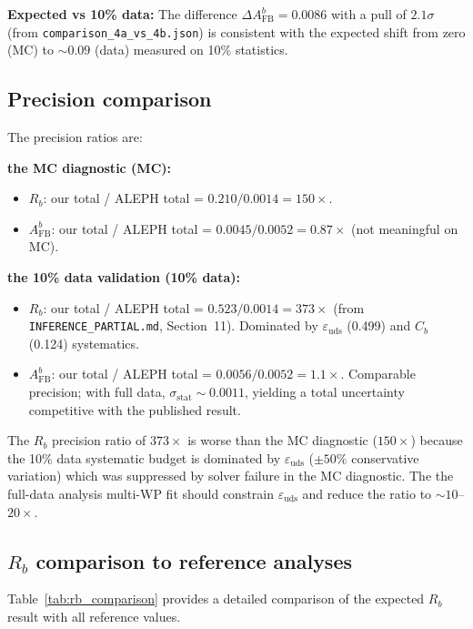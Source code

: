 \documentclass[11pt,a4paper]{article}
\begin{document}
\textbf{Expected vs 10\% data:} The difference $\Delta A_\mathrm{FB}^b = 0.0086$ with
a pull of $2.1\sigma$ (from \texttt{comparison\_4a\_vs\_4b.json}) is consistent with
the expected shift from zero (MC) to $\sim 0.09$ (data) measured on 10\% statistics.

\subsection{Precision comparison}
\label{sec:precision_comparison}

The precision ratios are:

\textbf{the MC diagnostic (MC):}
\begin{itemize}
\item $R_b$: our total / ALEPH total = $0.210/0.0014 = 150\times$.
\item $A_\mathrm{FB}^b$: our total / ALEPH total = $0.0045/0.0052 = 0.87\times$
(not meaningful on MC).
\end{itemize}

\textbf{the 10\% data validation (10\% data):}
\begin{itemize}
\item $R_b$: our total / ALEPH total = $0.523/0.0014 = 373\times$
(from \texttt{INFERENCE\_PARTIAL.md}, Section~11). Dominated by
$\varepsilon_\mathrm{uds}$ (0.499) and $C_b$ (0.124) systematics.
\item $A_\mathrm{FB}^b$: our total / ALEPH total = $0.0056/0.0052 = 1.1\times$.
Comparable precision; with full data, $\sigma_\mathrm{stat} \sim 0.0011$, yielding
a total uncertainty competitive with the published result.
\end{itemize}

The $R_b$ precision ratio of $373\times$ is worse than the MC diagnostic ($150\times$) because
the 10\% data systematic budget is dominated by $\varepsilon_\mathrm{uds}$ ($\pm 50\%$
conservative variation) which was suppressed by solver failure in the MC diagnostic. The
the full-data analysis multi-WP fit should constrain $\varepsilon_\mathrm{uds}$ and reduce the ratio
to $\sim 10$--$20\times$.

\subsection{$R_b$ comparison to reference analyses}
\label{sec:rb_comparison_detail}

Table~\ref{tab:rb_comparison} provides a detailed comparison of the expected $R_b$
result with all reference values.
\end{document}
